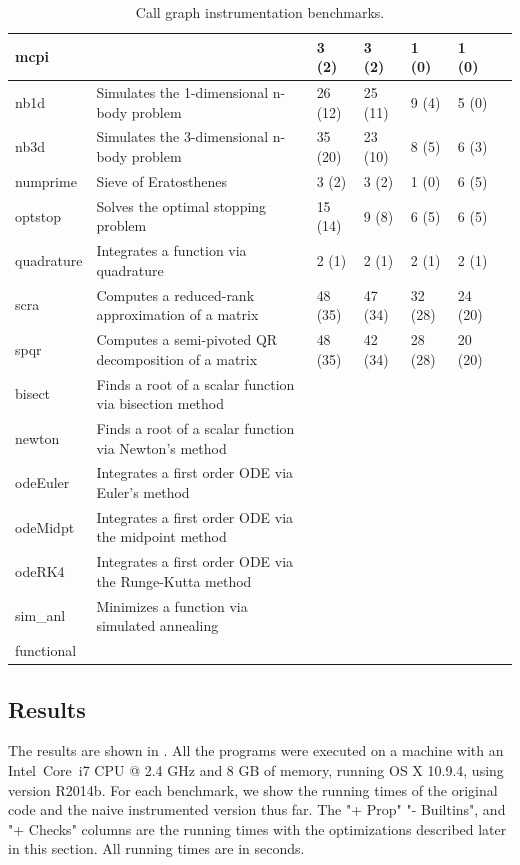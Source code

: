 \begin{table}
\begin{tabular}{| l | p{8.5cm} | l | l | l | l | l |}
  mcpi        & & 3 (2) & 3 (2) & 1 (0) & 1 (0) \\ \hline
  nb1d        & Simulates the 1-dimensional n-body problem & 26 (12) & 25 (11) & 9 (4) & 5 (0) \\ \hline
  nb3d        & Simulates the 3-dimensional n-body problem & 35 (20) & 23 (10) & 8 (5) & 6 (3) \\ \hline
  numprime    & Sieve of Eratosthenes & 3 (2) & 3 (2) & 1 (0) & 6 (5) \\ \hline
  optstop     & Solves the optimal stopping problem & 15 (14) & 9 (8) & 6 (5) & 6 (5) \\ \hline
  quadrature  & Integrates a function via quadrature & 2 (1) & 2 (1) & 2 (1) & 2 (1)\\ \hline
  scra        & Computes a reduced-rank approximation of a matrix & 48 (35) & 47 (34) & 32 (28) & 24 (20) \\ \hline
  spqr        & Computes a semi-pivoted QR decomposition of a matrix & 48 (35) & 42 (34) & 28 (28) & 20 (20) \\ \hline
  bisect      & Finds a root of a scalar function via bisection method & \\ \hline
  newton      & Finds a root of a scalar function via Newton's method & \\ \hline
  odeEuler    & Integrates a first order ODE via Euler's method & \\ \hline
  odeMidpt    & Integrates a first order ODE via the midpoint method & \\ \hline
  odeRK4      & Integrates a first order ODE via the Runge-Kutta method & \\ \hline
  sim\_anl    & Minimizes a function via simulated annealing & \\ \hline
  functional  & \\ \hline

\end{tabular}
\caption{Call graph instrumentation benchmarks.}
\label{tab:InstrumentationBenchmarks}
\end{table}

\subsection{Results}

The results are shown in . All the
programs were executed on a machine with an Intel\textregistered \,
Core\texttrademark \, i7 CPU @ 2.4 GHz and 8 GB of memory, running OS X 10.9.4,
using \matlab version R2014b. For each benchmark, we show the running times of
the original code and the naive instrumented version thus far. The "+ Prop" "-
Builtins", and "+ Checks" columns are the running times with the optimizations
described later in this section. All running times are in seconds.

